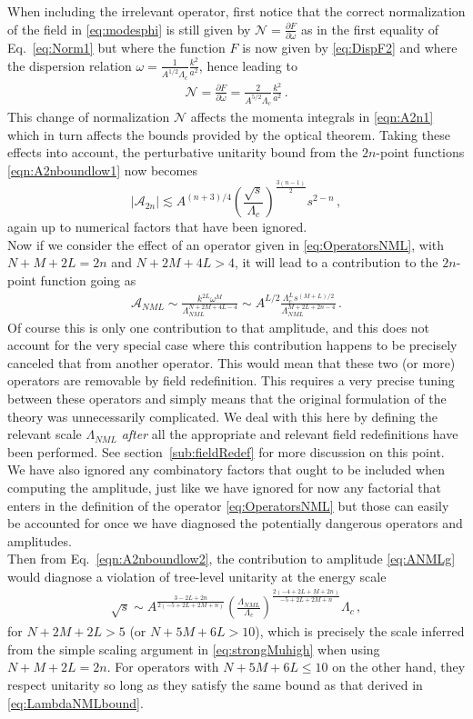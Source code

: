 \documentclass[12pt]{article}
\newcommand{\A}{\mathcal{A}}
\def\ba{\begin{eqnarray}}
\def\ea{\end{eqnarray}}
\def\({\left(}
\def\){\right)}
\def\p{\partial}
\def\p{\partial}
\def\A{\mathcal{A}}
\begin{document}
When including the irrelevant operator, first notice that the correct normalization of the field in \eqref{eq:modesphi}
is still given by $\mathcal{N}=\frac{\p F}{\p \omega}$ as in the first equality of Eq.~\eqref{eq:Norm1} but where the function $F$ is now given by \eqref{eq:DispF2} and where the dispersion relation $\omega=\frac{1}{A^{1/2} \Lambda_c }\frac{k^2}{a^2}$, hence leading to
\ba
\mathcal{N}=\frac{\p F}{\p \omega} = \frac{2}{A^{5/2} \Lambda_c} \frac{k^2}{a^2}\,.
\ea
This change of normalization $\mathcal{N}$ affects the momenta integrals in \eqref{eqn:A2n1} which in turn affects the bounds provided by the optical theorem.
Taking these effects into account, the perturbative unitarity bound from the $2n$-point functions \eqref{eqn:A2nboundlow1} now becomes
\begin{equation}
 | \A_{2n} |  \lesssim  A^{(n+3)/4} \(\frac{\sqrt{s}}{\Lambda_c}\)^{\frac{3(n-1)}{2}} s^{2-n} \,,
\label{eqn:A2nboundlow2}
\end{equation}
again up to numerical factors that have been ignored.\\

Now if we consider the effect of an operator given in \eqref{eq:OperatorsNML}, with $N+M+2L=2n$ and $N+2M+4L>4$, it will lead to a contribution to the $2n$-point function going as
\ba
\label{eq:ANMLg}
\A_{NML}\sim \frac{k^{2L}\omega^M}{\Lambda_{NML}^{N+2M+4L-4}}\sim A^{L/2}\frac{\Lambda_c^L s^{(M+L)/2}}{\Lambda_{NML}^{M+2L+2n-4}}\,.
\ea
Of course this is only one contribution to that amplitude, and this does not account for the very special case where this contribution happens to be precisely canceled that from another operator. This would mean that these two (or more) operators are removable by field redefinition. This requires a very precise tuning between these operators and simply means that the original formulation of the theory was unnecessarily complicated. We deal with this here by defining the relevant scale $\Lambda_{NML}$ \emph{after} all the appropriate and relevant field redefinitions have been performed. See section~\ref{sub:fieldRedef} for more discussion on this point. We have also ignored any combinatory factors that ought to be included when computing the amplitude, just like we have ignored for now any factorial that enters in the definition of the operator \eqref{eq:OperatorsNML} but those can easily be accounted for once we have diagnosed the potentially dangerous operators and amplitudes.  \\

Then from Eq.~\eqref{eqn:A2nboundlow2}, the contribution to amplitude \eqref{eq:ANMLg} would diagnose a violation of tree-level unitarity at the energy scale
\ba
\sqrt{s}\sim A^{\frac{3-2L+2n}{2(-5+2L+2M+n)}}\(\frac{\Lambda_{NML}}{\Lambda_c}\)^{\frac{2(-4+2L+M+2n)}{-5+2L+2M+n}}\Lambda_c\,,
\ea
for $N+2M+2L>5$ (or $N+5M+6L>10$),
which is precisely the scale inferred from the simple scaling argument in \eqref{eq:strongMuhigh} when using  $N+M+2L=2n$. For operators with $N+5M+6L\le10$ on the other hand, they respect unitarity so long as they satisfy the same bound as that derived in \eqref{eq:LambdaNMLbound}.  \\
\end{document}
